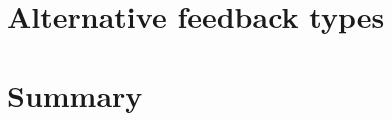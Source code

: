 \citep{Bonneau2011}

%	
	
	
	
\section{Alternative feedback types}
\label{sec:fb:alternative}

%	
%	

\section{Summary}
\label{sec:fb:summary}